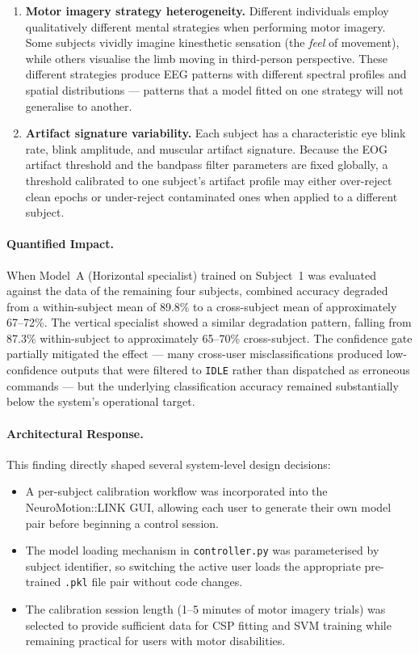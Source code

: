 \documentclass[12pt, a4paper, oneside]{report}
\begin{document}
\begin{description}
\begin{enumerate}
    \item \textbf{Motor imagery strategy heterogeneity.}
    Different individuals employ qualitatively different mental strategies when
    performing motor imagery. Some subjects vividly imagine kinesthetic sensation
    (the \textit{feel} of movement), while others visualise the limb moving in
    third-person perspective. These different strategies produce EEG patterns
    with different spectral profiles and spatial distributions --- patterns that
    a model fitted on one strategy will not generalise to another.

    \item \textbf{Artifact signature variability.}
    Each subject has a characteristic eye blink rate, blink amplitude, and
    muscular artifact signature. Because the EOG artifact threshold and the
    bandpass filter parameters are fixed globally, a threshold calibrated to one
    subject's artifact profile may either over-reject clean epochs or
    under-reject contaminated ones when applied to a different subject.
\end{enumerate}

\paragraph{Quantified Impact.}
When Model~A (Horizontal specialist) trained on Subject~1 was evaluated against
the data of the remaining four subjects, combined accuracy degraded from a
within-subject mean of 89.8\% to a cross-subject mean of approximately 67--72\%.
The vertical specialist showed a similar degradation pattern, falling from
87.3\% within-subject to approximately 65--70\% cross-subject. The confidence
gate partially mitigated the effect --- many cross-user misclassifications
produced low-confidence outputs that were filtered to \texttt{IDLE} rather than
dispatched as erroneous commands --- but the underlying classification accuracy
remained substantially below the system's operational target.

\paragraph{Architectural Response.}
This finding directly shaped several system-level design decisions:

\begin{itemize}
    \item A per-subject calibration workflow was incorporated into the
          NeuroMotion::LINK GUI, allowing each user to generate their own
          model pair before beginning a control session.
    \item The model loading mechanism in \texttt{controller.py} was parameterised
          by subject identifier, so switching the active user loads the
          appropriate pre-trained \texttt{.pkl} file pair without code changes.
    \item The calibration session length (1--5 minutes of motor imagery trials)
          was selected to provide sufficient data for CSP fitting and SVM
          training while remaining practical for users with motor disabilities.
\end{itemize}


\end{description}
\end{document}
